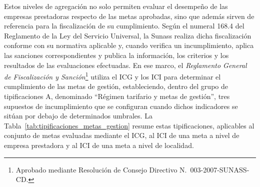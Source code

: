 Estos niveles de agregación no solo permiten evaluar el desempeño de las empresas prestadoras respecto de las metas aprobadas, sino que además sirven de referencia para la fiscalización de su cumplimiento. Según el numeral 168.4 del Reglamento de la Ley del Servicio Universal, la Sunass realiza dicha fiscalización conforme con su normativa aplicable y, cuando verifica un incumplimiento, aplica las sanciones correspondientes y publica la información, los criterios y los resultados de las evaluaciones efectuadas. En ese marco, el \textit{Reglamento General de Fiscalización y Sanción}\footnote{Aprobado mediante Resolución de Consejo Directivo N.\textdegree~003-2007-SUNASS-CD.} utiliza el ICG y los ICI para determinar el cumplimiento de las metas de gestión, estableciendo, dentro del grupo de tipificaciones A, denominado ``Régimen tarifario y metas de gestión'', tres supuestos de incumplimiento que se configuran cuando dichos indicadores se sitúan por debajo de determinados umbrales. La Tabla~\ref{tab:tipificaciones_metas_gestion} resume estas tipificaciones, aplicables al conjunto de metas evaluadas mediante el ICG, al ICI de una meta a nivel de empresa prestadora y al ICI de una meta a nivel de localidad.
 
